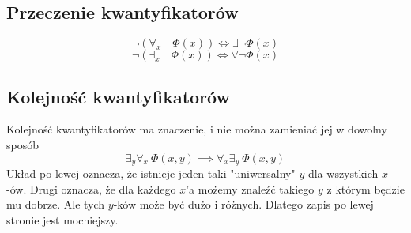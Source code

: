 \documentclass[11pt]{article}
\begin{document}
\subsection{Przeczenie kwantyfikatorów}
$$ \neg( \forall_x \quad \Phi(x)) \iff \exists \neg \Phi(x) $$
$$ \neg( \exists_x \quad \Phi(x)) \iff \forall \neg \Phi(x) $$
\subsection{Kolejność kwantyfikatorów}
Kolejność kwantyfikatorów ma znaczenie, i nie można zamieniać jej w dowolny sposób
$$ \exists_y \forall_x\ \Phi(x,y) \implies \forall_x \exists_y\ \Phi(x,y) $$
Układ po lewej oznacza, że istnieje jeden taki "uniwersalny" $y$ dla wszystkich $x$-ów. Drugi oznacza, że dla każdego $x$'a możemy znaleźć takiego $y$ z którym będzie mu dobrze. Ale tych $y$-ków może być dużo i różnych. Dlatego zapis po lewej stronie jest mocniejszy.
\end{document}
